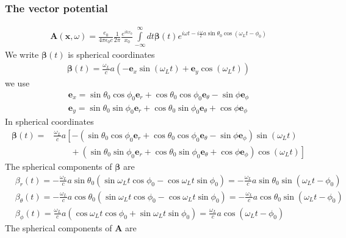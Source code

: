 \subsubsection{The vector potential}
\begin{align}
    {\bm A}({\bm x},\omega)= \frac{e_0}{4\pi\epsilon_0c}\frac1{2\pi}\frac{e^{ik x_0}}{x_0}\int\limits_{-\infty}^{\infty}dt {\boldsymbol{\beta}}(t)e^{i\omega t-i\frac{\omega}ca\sin\theta_0\cos(\omega_Lt-\phi_0)}
\end{align}
We write ${\boldsymbol{\beta}}(t)$ is spherical coordinates
\begin{align}
    {\boldsymbol{\beta}}(t)=\frac{\omega_L}c a(-{\bm e}_x\sin(\omega_L t)+{\bm e}_y\cos(\omega_Lt))
\end{align}
we use
\begin{align}
    {\bm e}_x=\sin\theta_0\cos\phi_0{\bm e}_r+\cos\theta_0\cos\phi_0{\bm e}_\theta-\sin\phi{\bm e}_\phi \\
    {\bm e}_y=\sin\theta_0\sin\phi_0{\bm e}_r+\cos\theta_0\sin\phi_0{\bm e}_\theta+\cos\phi{\bm e}_\phi
\end{align}
In spherical coordinates
\begin{align}
    {\boldsymbol{\beta}}(t) = & \frac{\omega_L}c a\left[-(\sin\theta_0\cos\phi_0{\bm e}_r+\cos\theta_0\cos\phi_0{\bm e}_\theta-\sin\phi{\bm e}_\phi )\sin(\omega_L t)\right.\nonumber \\
                              & \quad\quad + \left.(\sin\theta_0\sin\phi_0{\bm e}_r+\cos\theta_0\sin\phi_0{\bm e}_\theta+\cos\phi{\bm e}_\phi)\cos(\omega_Lt)\right]
\end{align}
The spherical components of $\boldsymbol{\beta}$ are
\begin{align}
     & \beta_r(t)=-\frac{\omega_L}ca\sin\theta_0(\sin\omega_Lt\cos\phi_0-\cos\omega_Lt\sin\phi_0)=-\frac{\omega_L}{c}a\sin\theta_0\sin(\omega_Lt-\phi_0)      \\
     & \beta_\theta(t)=-\frac{\omega_L}ca\cos\theta_0(\sin\omega_Lt\cos\phi_0-\cos\omega_Lt\sin\phi_0)=-\frac{\omega_L}{c}a\cos\theta_0\sin(\omega_Lt-\phi_0) \\
     & \beta_\phi(t)=\frac{\omega_L}{c}a(\cos\omega_Lt\cos\phi_0+\sin\omega_Lt\sin\phi_0)=\frac{\omega_L}ca\cos(\omega_Lt-\phi_0)
\end{align}
The spherical components of ${\bm A}$ are
